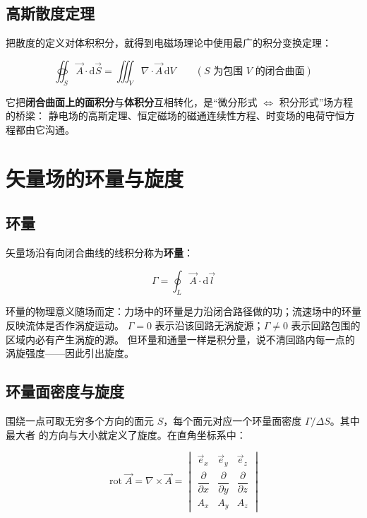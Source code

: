 \subsection{高斯散度定理}

把散度的定义对体积积分，就得到电磁场理论中使用最广的积分变换定理：
\begin{formulaBox}
\[
\oiint_S\vec{A}\cdot\mathrm{d}\vec{S}=\iiint_V\nabla\cdot\vec{A}\,\mathrm{d}V
\qquad (S \text{ 为包围 } V \text{ 的闭合曲面})
\]
\end{formulaBox}

它把\textbf{闭合曲面上的面积分}与\textbf{体积分}互相转化，是“微分形式 $\Leftrightarrow$ 积分形式”场方程的桥梁：
静电场的高斯定理、恒定磁场的磁通连续性方程、时变场的电荷守恒方程都由它沟通。


\section{矢量场的环量与旋度}

\subsection{环量}

矢量场沿有向闭合曲线的线积分称为\textbf{环量}：
\begin{formulaBox}
\[
\Gamma=\oint_L\vec{A}\cdot\mathrm{d}\vec{l}
\]
\end{formulaBox}

环量的物理意义随场而定：力场中的环量是力沿闭合路径做的功；流速场中的环量反映流体是否作涡旋运动。
$\Gamma=0$ 表示沿该回路无涡旋源；$\Gamma\neq 0$ 表示回路包围的区域内必有产生涡旋的源。
但环量和通量一样是积分量，说不清回路内每一点的涡旋强度——因此引出旋度。

\subsection{环量面密度与旋度}

围绕一点可取无穷多个方向的面元 $S$，每个面元对应一个环量面密度 $\Gamma/\Delta S$。其中最大者
的方向与大小就定义了旋度。在直角坐标系中：
\begin{formulaBox}
\[
\operatorname{rot}\vec{A}=\nabla\times\vec{A}=
\begin{vmatrix}
\vec{e}_x & \vec{e}_y & \vec{e}_z\\[2pt]
\dfrac{\partial}{\partial x} & \dfrac{\partial}{\partial y} & \dfrac{\partial}{\partial z}\\[6pt]
A_x & A_y & A_z
\end{vmatrix}
\]
\end{formulaBox}

